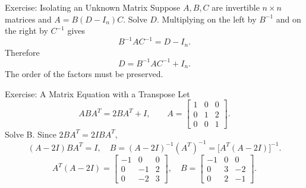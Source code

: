 \begin{frame}{Exercise: Isolating an Unknown Matrix}
Suppose $A,B,C$ are invertible $n\times n$ matrices and $A=B(D-I_n)C$. Solve $D$.
\pause
Multiplying on the left by $B^{-1}$ and on the right by $C^{-1}$ gives
\[
B^{-1}AC^{-1}=D-I_n.
\]
Therefore
\[
\boxed{D=B^{-1}AC^{-1}+I_n}.
\]
The order of the factors must be preserved.
\end{frame}

\begin{frame}[shrink=7]{Exercise: A Matrix Equation with a Transpose}
Let
\[
ABA^T=2BA^T+I,\qquad
A=\begin{bmatrix}1&0&0\\0&1&2\\0&0&1\end{bmatrix}.
\] Solve B.
\pause
Since $2BA^T=2IBA^T$,
\[
(A-2I)BA^T=I,
\quad B=(A-2I)^{-1}(A^T)^{-1}=\bigl[A^T(A-2I)\bigr]^{-1}.
\]
\pause
\[
A^T(A-2I)=\begin{bmatrix}-1&0&0\\0&-1&2\\0&-2&3\end{bmatrix},
\quad
\boxed{B=\begin{bmatrix}-1&0&0\\0&3&-2\\0&2&-1\end{bmatrix}}.
\]
\end{frame}
